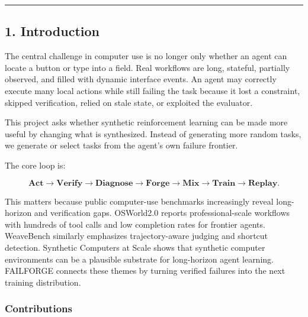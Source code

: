 \documentclass[
]{article}
\begin{document}
\begin{center}\rule{0.5\linewidth}{0.5pt}\end{center}

\subsection{1. Introduction}\label{introduction}

The central challenge in computer use is no longer only whether an agent
can locate a button or type into a field. Real workflows are long,
stateful, partially observed, and filled with dynamic interface events.
An agent may correctly execute many local actions while still failing
the task because it lost a constraint, skipped verification, relied on
stale state, or exploited the evaluator.

This project asks whether synthetic reinforcement learning can be made
more useful by changing what is synthesized. Instead of generating more
random tasks, we generate or select tasks from the agent's own failure
frontier.

The core loop is:

\[ \textbf{Act} \rightarrow \textbf{Verify}
\rightarrow \textbf{Diagnose} \rightarrow \textbf{Forge}
\rightarrow \textbf{Mix} \rightarrow \textbf{Train}
\rightarrow \textbf{Replay}. \]

This matters because public computer-use benchmarks increasingly reveal
long-horizon and verification gaps. OSWorld2.0 reports
professional-scale workflows with hundreds of tool calls and low
completion rates for frontier agents. WeaveBench similarly emphasizes
trajectory-aware judging and shortcut detection. Synthetic Computers at
Scale shows that synthetic computer environments can be a plausible
substrate for long-horizon agent learning. FAILFORGE connects these
themes by turning verified failures into the next training distribution.

\subsubsection{Contributions}\label{contributions}
\end{document}
